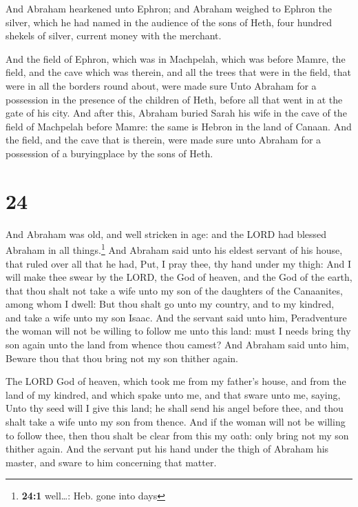  And Abraham hearkened unto Ephron; and Abraham weighed
to Ephron the silver, which he had named in the audience of the sons of
Heth, four hundred shekels of silver, current money with the merchant.

 And the field of Ephron, which was in Machpelah, which
was before Mamre, the field, and the cave which was therein, and all the
trees that were in the field, that were in all the borders round about,
were made sure  Unto Abraham for a possession in the
presence of the children of Heth, before all that went in at the gate of
his city.  And after this, Abraham buried Sarah his wife
in the cave of the field of Machpelah before Mamre: the same is Hebron
in the land of Canaan.  And the field, and the cave that
is therein, were made sure unto Abraham for a possession of a
buryingplace by the sons of Heth.

\hypertarget{section-23}{%
\section{24}\label{section-23}}

 And Abraham was old, and well stricken in age: and the
LORD had blessed Abraham in all things.\footnote{\textbf{24:1}
  well\ldots: Heb. gone into days}  And Abraham said unto
his eldest servant of his house, that ruled over all that he had, Put, I
pray thee, thy hand under my thigh:  And I will make thee
swear by the LORD, the God of heaven, and the God of the earth, that
thou shalt not take a wife unto my son of the daughters of the
Canaanites, among whom I dwell:  But thou shalt go unto my
country, and to my kindred, and take a wife unto my son Isaac.
 And the servant said unto him, Peradventure the woman
will not be willing to follow me unto this land: must I needs bring thy
son again unto the land from whence thou camest?  And
Abraham said unto him, Beware thou that thou bring not my son thither
again.

 The LORD God of heaven, which took me from my father's
house, and from the land of my kindred, and which spake unto me, and
that sware unto me, saying, Unto thy seed will I give this land; he
shall send his angel before thee, and thou shalt take a wife unto my son
from thence.  And if the woman will not be willing to
follow thee, then thou shalt be clear from this my oath: only bring not
my son thither again.  And the servant put his hand under
the thigh of Abraham his master, and sware to him concerning that
matter.

